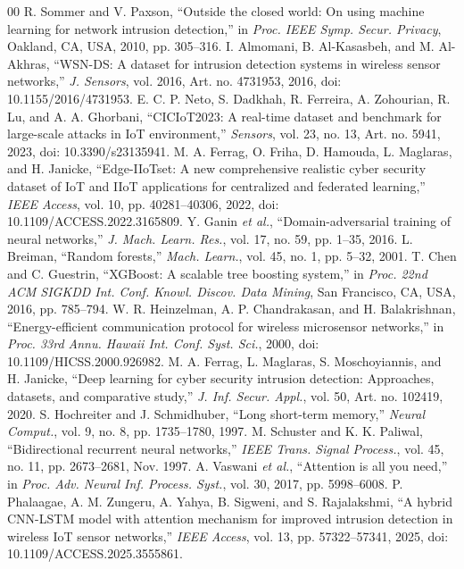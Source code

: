 \documentclass[conference]{IEEEtran}
\begin{document}
\begin{thebibliography}{00}
 R. Sommer and V. Paxson, ``Outside the closed world: On using machine learning for network intrusion detection,'' in \emph{Proc. IEEE Symp. Secur. Privacy}, Oakland, CA, USA, 2010, pp. 305--316.
 I. Almomani, B. Al-Kasasbeh, and M. Al-Akhras, ``WSN-DS: A dataset for intrusion detection systems in wireless sensor networks,'' \emph{J. Sensors}, vol. 2016, Art. no. 4731953, 2016, doi: 10.1155/2016/4731953.
 E. C. P. Neto, S. Dadkhah, R. Ferreira, A. Zohourian, R. Lu, and A. A. Ghorbani, ``CICIoT2023: A real-time dataset and benchmark for large-scale attacks in IoT environment,'' \emph{Sensors}, vol. 23, no. 13, Art. no. 5941, 2023, doi: 10.3390/s23135941.
 M. A. Ferrag, O. Friha, D. Hamouda, L. Maglaras, and H. Janicke, ``Edge-IIoTset: A new comprehensive realistic cyber security dataset of IoT and IIoT applications for centralized and federated learning,'' \emph{IEEE Access}, vol. 10, pp. 40281--40306, 2022, doi: 10.1109/ACCESS.2022.3165809.
 Y. Ganin \emph{et al.}, ``Domain-adversarial training of neural networks,'' \emph{J. Mach. Learn. Res.}, vol. 17, no. 59, pp. 1--35, 2016.
 L. Breiman, ``Random forests,'' \emph{Mach. Learn.}, vol. 45, no. 1, pp. 5--32, 2001.
 T. Chen and C. Guestrin, ``XGBoost: A scalable tree boosting system,'' in \emph{Proc. 22nd ACM SIGKDD Int. Conf. Knowl. Discov. Data Mining}, San Francisco, CA, USA, 2016, pp. 785--794.
 W. R. Heinzelman, A. P. Chandrakasan, and H. Balakrishnan, ``Energy-efficient communication protocol for wireless microsensor networks,'' in \emph{Proc. 33rd Annu. Hawaii Int. Conf. Syst. Sci.}, 2000, doi: 10.1109/HICSS.2000.926982.
 M. A. Ferrag, L. Maglaras, S. Moschoyiannis, and H. Janicke, ``Deep learning for cyber security intrusion detection: Approaches, datasets, and comparative study,'' \emph{J. Inf. Secur. Appl.}, vol. 50, Art. no. 102419, 2020.
 S. Hochreiter and J. Schmidhuber, ``Long short-term memory,'' \emph{Neural Comput.}, vol. 9, no. 8, pp. 1735--1780, 1997.
 M. Schuster and K. K. Paliwal, ``Bidirectional recurrent neural networks,'' \emph{IEEE Trans. Signal Process.}, vol. 45, no. 11, pp. 2673--2681, Nov. 1997.
 A. Vaswani \emph{et al.}, ``Attention is all you need,'' in \emph{Proc. Adv. Neural Inf. Process. Syst.}, vol. 30, 2017, pp. 5998--6008.
 P. Phalaagae, A. M. Zungeru, A. Yahya, B. Sigweni, and S. Rajalakshmi, ``A hybrid CNN-LSTM model with attention mechanism for improved intrusion detection in wireless IoT sensor networks,'' \emph{IEEE Access}, vol. 13, pp. 57322--57341, 2025, doi: 10.1109/ACCESS.2025.3555861.

\end{thebibliography}
\end{document}
